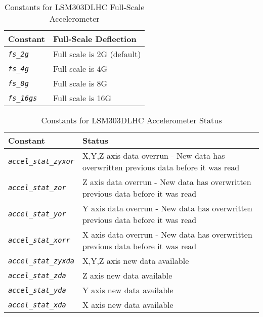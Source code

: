 \documentclass[10pt, openany]{book}
\newcommand{\constant}[1]{\emph{\texttt{#1}}}
\begin{document}
\begin{table}[!h]
\begin{center}
  \begin{tabular}{l|l}
    Constant & Full-Scale Deflection \\
    \hline
    \constant{fs\_2g} & Full scale is 2G (default) \\
    \constant{fs\_4g} & Full scale is 4G \\
    \constant{fs\_8g} & Full scale is 8G \\
    \constant{fs\_16gs} & Full scale is 16G \\
  \end{tabular}
  \caption{Constants for LSM303DLHC Full-Scale Accelerometer}
  \label{tbl:LSM303DLHCafs}
\end{center}
\end{table}

\begin{table}[!h]
\begin{center}
  \begin{tabular}{l|l}
    Constant & Status \\
    \hline
    \constant{accel\_stat\_zyxor} & X,Y,Z axis data overrun - New data has overwritten previous data before it was read \\
    \constant{accel\_stat\_zor} & Z axis data overrun - New data has overwritten previous data before it was read \\
    \constant{accel\_stat\_yor} & Y axis data overrun - New data has overwritten previous data before it was read \\
    \constant{accel\_stat\_xorr} & X axis data overrun - New data has overwritten previous data before it was read \\
    \constant{accel\_stat\_zyxda} & X,Y,Z axis new data available \\
    \constant{accel\_stat\_zda} & Z axis new data available \\
    \constant{accel\_stat\_yda} & Y axis new data available \\
    \constant{accel\_stat\_xda} & X axis new data available \\
  \end{tabular}
  \caption{Constants for LSM303DLHC Accelerometer Status}
  \label{tbl:LSM303DLHCaStat}
\end{center}
\end{table}
\end{document}

